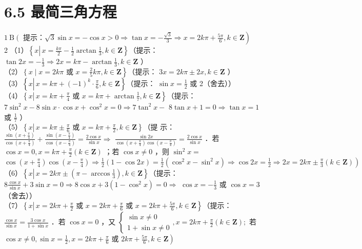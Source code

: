 \documentclass[10pt]{article}
\begin{document}
\section*{6.5 最简三角方程}
\(1 \mathrm{~B}\left(\right.\) 提示：\(\left.\sqrt{3} \sin x=-\cos x>0 \Rightarrow \tan x=-\frac{\sqrt{3}}{3} \Rightarrow x=2 k \pi+\frac{5 \pi}{6}, k \in \mathbf{Z}\right)\)\\
2 （1）\(\left\{x \left\lvert\, x=\frac{k \pi}{2}-\frac{1}{2} \arctan \frac{1}{3}\right., k \in \mathbf{Z}\right\}\)（提示： \(\tan 2 x=-\frac{1}{3} \Rightarrow 2 x=k \pi-\arctan \frac{1}{3}, k \in \mathbf{Z}\) ）\\
（2）\(\left\{x \mid x=2 k \pi\right.\) 或 \(\left.x=\frac{2}{5} k \pi, k \in \mathbf{Z}\right\}\)（提示： \(3 x=2 k \pi \pm 2 x, k \in \mathbf{Z}\) ）\\
（3）\(\left\{x \left\lvert\, x=k \pi+(-1)^{k} \cdot \frac{\pi}{6}\right., k \in \mathbf{Z}\right\}\)（提示： \(\sin x=\frac{1}{2}\) 或 2（舍去））\\
（4）\(\left\{x \left\lvert\, x=k \pi+\frac{\pi}{4}\right.\right.\) 或 \(\left.x=k \pi+\arctan \frac{1}{7}, k \in \mathbf{Z}\right\}\)（提示： \(7 \sin ^{2} x-8 \sin x \cdot \cos x+\cos ^{2} x=0 \Rightarrow 7 \tan ^{2} x-\) \(8 \tan x+1=0 \Rightarrow \tan x=1\) 或 \(\frac{1}{7}\) ）\\
（5）\(\left\{x \left\lvert\, x=k \pi \pm \frac{\pi}{6}\right.\right.\) 或 \(\left.x=k \pi+\frac{\pi}{2}, k \in \mathbf{Z}\right\}\)（提 示：\(\frac{\sin \left(x+\frac{\pi}{4}\right)}{\cos \left(x+\frac{\pi}{4}\right)}+\frac{\sin \left(x-\frac{\pi}{4}\right)}{\cos \left(x-\frac{\pi}{4}\right)}=\frac{2 \cos x}{\sin x} \Rightarrow\) \(\frac{\sin 2 x}{\cos \left(x+\frac{\pi}{4}\right) \cos \left(x-\frac{\pi}{4}\right)}=\frac{2 \cos x}{\sin x}\) ．若 \(\cos x=0, x=k \pi+\frac{\pi}{2}(k \in \mathbf{Z})\) ；若 \(\cos x \neq 0\) ，则 \(\sin ^{2} x=\) \(\left.\cos \left(x+\frac{\pi}{4}\right) \cos \left(x-\frac{\pi}{4}\right) \Rightarrow \frac{1}{2}(1-\cos 2 x)=\frac{1}{2}\left(\cos ^{2} x-\sin ^{2} x\right) \Rightarrow \cos 2 x=\frac{1}{2} \Rightarrow 2 x=2 k \pi \pm \frac{\pi}{3}(k \in \mathbf{Z})\right)\) （6）\(\left\{x \left\lvert\, x=2 k \pi \pm\left(\pi-\arccos \frac{1}{3}\right)\right., k \in \mathbf{Z}\right\}\)（提示： \(8 \frac{\cos x}{\sin x}+3 \sin x=0 \Rightarrow 8 \cos x+3\left(1-\cos ^{2} x\right)=0 \Rightarrow\) \(\cos x=-\frac{1}{3}\) 或 \(\cos x=3\)（舍去））\\
（7）\(\left\{x \left\lvert\, x=2 k \pi+\frac{\pi}{2}\right.\right.\) 或 \(x=2 k \pi+\frac{\pi}{6}\) 或 \(\left.x=2 k \pi+\frac{5 \pi}{6}, k \in \mathbf{Z}\right\}\)（提示：\(\frac{\cos x}{\sin x}=\frac{3 \cos x}{1+\sin x}\) ．若 \(\cos x=0\) ，又 \(\left\{\begin{array}{l}\sin x \neq 0 \\ 1+\sin x \neq 0\end{array}, x=2 k \pi+\frac{\pi}{2}(k \in \mathbf{Z}) ;\right.\) 若 \(\cos x \neq 0, \sin x=\frac{1}{2}, x=2 k \pi+\frac{\pi}{6}\) 或 \(\left.2 k \pi+\frac{5 \pi}{6}, k \in \mathbf{Z}\right)\)\\
\end{document}
